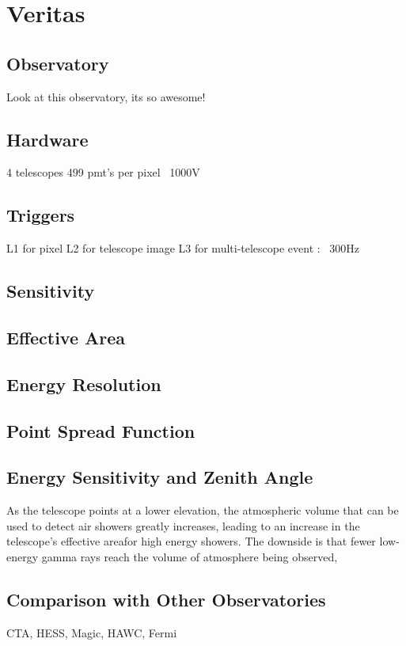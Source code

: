\cleartooddpage[\thispagestyle{empty}]
\chapter{Veritas}

\section{Observatory}
Look at this observatory, its so awesome!

\section{Hardware}

4 telescopes
499 pmt's per pixel
~1000V

\section{Triggers}
L1 for pixel
L2 for telescope image
L3 for multi-telescope event : ~300Hz

\section{Sensitivity}

\section{Effective Area}

\section{Energy Resolution}

\section{Point Spread Function}

\section{Energy Sensitivity and Zenith Angle}

As the telescope points at a lower elevation, the atmospheric volume that can be used to detect air showers greatly increases, leading to an increase in the telescope's effective areafor high energy showers.
The downside is that fewer low-energy gamma rays reach the volume of atmosphere being observed, 

\section{Comparison with Other Observatories}


CTA, HESS, Magic, HAWC, Fermi
